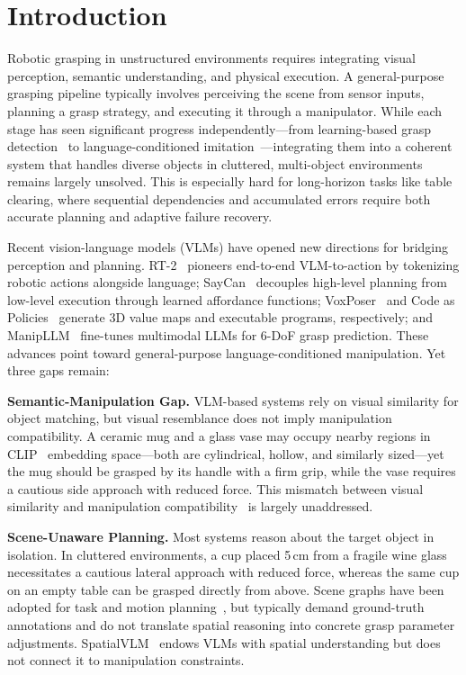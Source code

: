 \documentclass[letterpaper, 10pt, conference]{ieeeconf}
\begin{document}
\section{Introduction}
\label{sec:intro}

Robotic grasping in unstructured environments requires integrating visual perception, semantic understanding, and physical execution.
A general-purpose grasping pipeline typically involves perceiving the scene from sensor inputs, planning a grasp strategy, and executing it through a manipulator.
While each stage has seen significant progress independently---from learning-based grasp detection~\cite{kumra2020grconvnet, fang2023anygrasp} to language-conditioned imitation~\cite{shridhar2022cliport}---integrating them into a coherent system that handles diverse objects in cluttered, multi-object environments remains largely unsolved.
This is especially hard for long-horizon tasks like table clearing, where sequential dependencies and accumulated errors require both accurate planning and adaptive failure recovery.

Recent vision-language models (VLMs) have opened new directions for bridging perception and planning.
RT-2~\cite{brohan2023rt2} pioneers end-to-end VLM-to-action by tokenizing robotic actions alongside language; SayCan~\cite{ahn2022saycan} decouples high-level planning from low-level execution through learned affordance functions; VoxPoser~\cite{huang2023voxposer} and Code as Policies~\cite{liang2023code} generate 3D value maps and executable programs, respectively; and ManipLLM~\cite{li2024manipllm} fine-tunes multimodal LLMs for 6-DoF grasp prediction.
These advances point toward general-purpose language-conditioned manipulation.
Yet three gaps remain:

\textbf{Semantic-Manipulation Gap.}
VLM-based systems rely on visual similarity for object matching, but visual resemblance does not imply manipulation compatibility.
A ceramic mug and a glass vase may occupy nearby regions in CLIP~\cite{radford2021clip} embedding space---both are cylindrical, hollow, and similarly sized---yet the mug should be grasped by its handle with a firm grip, while the vase requires a cautious side approach with reduced force.
This mismatch between visual similarity and manipulation compatibility~\cite{gibson1977affordance} is largely unaddressed.

\textbf{Scene-Unaware Planning.}
Most systems reason about the target object in isolation.
In cluttered environments, a cup placed 5\,cm from a fragile wine glass necessitates a cautious lateral approach with reduced force, whereas the same cup on an empty table can be grasped directly from above.
Scene graphs have been adopted for task and motion planning~\cite{zeng2020transporter}, but typically demand ground-truth annotations and do not translate spatial reasoning into concrete grasp parameter adjustments.
SpatialVLM~\cite{kwon2024spatialvlm} endows VLMs with spatial understanding but does not connect it to manipulation constraints.
\end{document}
